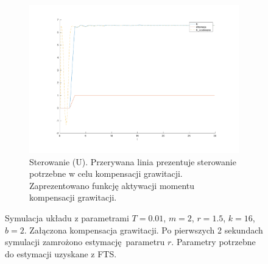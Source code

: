 \documentclass[a4paper, 10pt]{article}
\begin{document}
\begin{figure}
	\begin{subfigure}{.5\textwidth}
		\centering
		\includegraphics[width=\linewidth]{mrozenie_u}
		\caption{Sterowanie (U). Przerywana linia prezentuje sterowanie potrzebne w celu kompensacji grawitacji. Zaprezentowano funkcję aktywacji momentu kompensacji grawitacji.}
		\label{fig:mrozenie_u}
	\end{subfigure}
	
	\caption{Symulacja układu z parametrami $T=0.01$, $m = 2$, $r = 1.5$, $k = 16$, $b = 2$. Załączona kompensacja grawitacji. Po pierwszych 2 sekundach symulacji zamrożono estymację parametru $r$. Parametry potrzebne do estymacji uzyskane z FTS.}
	\label{fig:mrozenie}
\end{figure}
\end{document}

